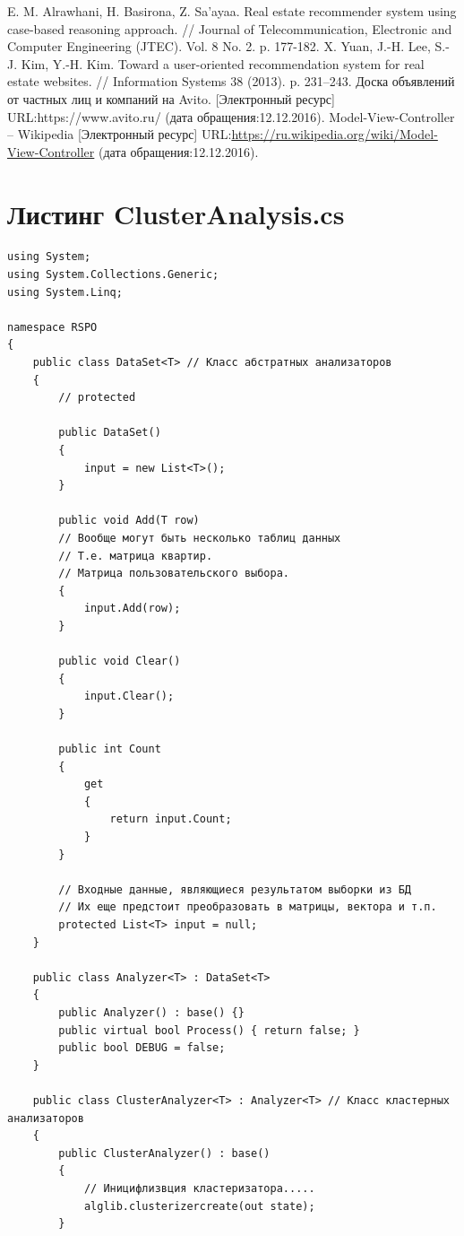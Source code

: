 \documentclass[a4paper,14pt,openany,final]{extreport} %
\renewcommand{\chaptername}{}
\begin{document}
{\begin{thebibliography}{99}
 E. M. Alrawhani, H. Basirona, Z. Sa’ayaa. Real estate recommender system using case-based reasoning approach. // Journal of Telecommunication, Electronic and Computer Engineering (JTEC). Vol. 8 No. 2. p. 177-182.
 X. Yuan, J.-H. Lee, S.-J. Kim, Y.-H. Kim. Toward a user-oriented recommendation system for real estate websites. // Information Systems 38 (2013). p. 231–243.
 Доска объявлений от частных лиц и компаний на Avito. [Электронный ресурс] URL:https://www.avito.ru/ (дата обращения:12.12.2016).
 Model-View-Controller -- Wikipedia [Электронный ресурс] URL:\url{https://ru.wikipedia.org/wiki/Model-View-Controller} (дата обращения:12.12.2016).

\end{thebibliography}

\appendix
\renewcommand{\chaptername}{ПРИЛОЖЕНИЕ}
\renewcommand{\thechapter}{\arabic{chapter}}
\chapter{Листинг ClusterAnalysis.cs}
\begin{verbatim}
using System;
using System.Collections.Generic;
using System.Linq;

namespace RSPO
{
	public class DataSet<T> // Класс абстратных анализаторов
	{
        // protected

		public DataSet()
        {
            input = new List<T>();
        }

        public void Add(T row)
        // Вообще могут быть несколько таблиц данных
        // Т.е. матрица квартир.
        // Матрица пользовательского выбора.
        {
            input.Add(row);
        }

        public void Clear()
        {
            input.Clear();
        }

        public int Count
        {
            get
            {
                return input.Count;
            }
        }

        // Входные данные, являющиеся результатом выборки из БД
        // Их еще предстоит преобразовать в матрицы, вектора и т.п.
        protected List<T> input = null;
	}

    public class Analyzer<T> : DataSet<T>
    {
        public Analyzer() : base() {}
        public virtual bool Process() { return false; }
        public bool DEBUG = false;
    }

	public class ClusterAnalyzer<T> : Analyzer<T> // Класс кластерных анализаторов
	{
		public ClusterAnalyzer() : base()
        {
            // Иницифлизвция кластеризатора.....
            alglib.clusterizercreate(out state);
        }


\end{verbatim}}
\end{document}
